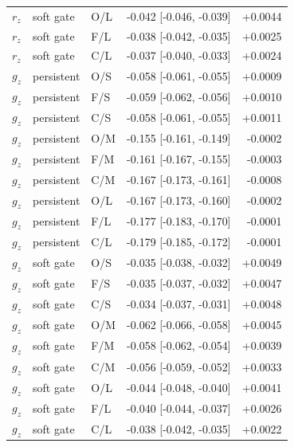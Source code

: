 \begin{longtable}{@{}lllp{4.4cm}r@{}}
$r_z$ & soft gate & O/L & -0.042 [-0.046, -0.039] & +0.0044\\
$r_z$ & soft gate & F/L & -0.038 [-0.042, -0.035] & +0.0025\\
$r_z$ & soft gate & C/L & -0.037 [-0.040, -0.033] & +0.0024\\
\midrule
$g_z$ & persistent & O/S & -0.058 [-0.061, -0.055] & +0.0009\\
$g_z$ & persistent & F/S & -0.059 [-0.062, -0.056] & +0.0010\\
$g_z$ & persistent & C/S & -0.058 [-0.061, -0.055] & +0.0011\\
$g_z$ & persistent & O/M & -0.155 [-0.161, -0.149] & -0.0002\\
$g_z$ & persistent & F/M & -0.161 [-0.167, -0.155] & -0.0003\\
$g_z$ & persistent & C/M & -0.167 [-0.173, -0.161] & -0.0008\\
$g_z$ & persistent & O/L & -0.167 [-0.173, -0.160] & -0.0002\\
$g_z$ & persistent & F/L & -0.177 [-0.183, -0.170] & -0.0001\\
$g_z$ & persistent & C/L & -0.179 [-0.185, -0.172] & -0.0001\\
\midrule
$g_z$ & soft gate & O/S & -0.035 [-0.038, -0.032] & +0.0049\\
$g_z$ & soft gate & F/S & -0.035 [-0.037, -0.032] & +0.0047\\
$g_z$ & soft gate & C/S & -0.034 [-0.037, -0.031] & +0.0048\\
$g_z$ & soft gate & O/M & -0.062 [-0.066, -0.058] & +0.0045\\
$g_z$ & soft gate & F/M & -0.058 [-0.062, -0.054] & +0.0039\\
$g_z$ & soft gate & C/M & -0.056 [-0.059, -0.052] & +0.0033\\
$g_z$ & soft gate & O/L & -0.044 [-0.048, -0.040] & +0.0041\\
$g_z$ & soft gate & F/L & -0.040 [-0.044, -0.037] & +0.0026\\
$g_z$ & soft gate & C/L & -0.038 [-0.042, -0.035] & +0.0022\\
\end{longtable}\endgroup
\begingroup\footnotesize\setlength{\tabcolsep}{4pt}\setlength\LTleft{0pt}\setlength\LTright{0pt}
